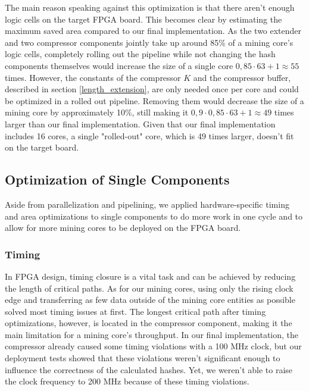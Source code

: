The main reason speaking against this optimization is that there aren't enough logic cells on the target FPGA board. This becomes clear by estimating the maximum saved area compared to our final implementation. As the two extender and two compressor components jointly take up around 85\% of a mining core's logic cells, completely rolling out the pipeline while not changing the hash components themselves would increase the size of a single core $ 0,85 \cdot 63 + 1 \approx 55$ times. However, the constants of the compressor $K$ and the compressor buffer, described in section \ref{length_extension}, are only needed once per core and could be optimized in a rolled out pipeline. Removing them would decrease the size of a mining core by approximately 10\%, still making it $ 0,9 \cdot 0,85 \cdot 63 + 1 \approx 49$ times larger than our final implementation. Given that our final implementation includes 16 cores, a single "rolled-out" core, which is 49 times larger, doesn't fit on the target board.





\subsection{Optimization of Single Components}

Aside from parallelization and pipelining, we applied hardware-specific timing and area optimizations to single components to do more work in one cycle and to allow for more mining cores to be deployed on the FPGA board.

\subsubsection{Timing}
\label{timing}

In FPGA design, timing closure is a vital task and can be achieved by reducing the length of critical paths. As for our mining cores, using only the rising clock edge and transferring as few data outside of the mining core entities as possible solved most timing issues at first. The longest critical path after timing optimizations, however, is located in the compressor component, making it the main limitation for a mining core's throughput. In our final implementation, the compressor already caused some timing violations with a 100 MHz clock, but our deployment tests showed that these violations weren't significant enough to influence the correctness of the calculated hashes. Yet, we weren’t able to raise the clock frequency to 200 MHz because of these timing violations.

